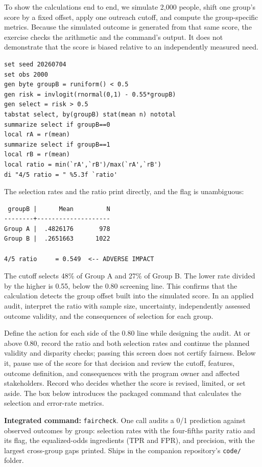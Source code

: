 \documentclass[
    a4paper,
    fontsize=10pt,
    twoside=true,
    numbers=noenddot,
]{kaobook}
\begin{document}
To show the calculations end to end, we simulate 2{,}000 people, shift one group's score by a fixed offset, apply one outreach cutoff, and compute the group-specific metrics. Because the simulated outcome is generated from that same score, the exercise checks the arithmetic and the command's output. It does not demonstrate that the score is biased relative to an independently measured need.
\par
{\footnotesize
\begin{verbatim}
set seed 20260704
set obs 2000
gen byte groupB = runiform() < 0.5
gen risk = invlogit(rnormal(0,1) - 0.55*groupB)
gen select = risk > 0.5
tabstat select, by(groupB) stat(mean n) nototal
summarize select if groupB==0
local rA = r(mean)
summarize select if groupB==1
local rB = r(mean)
local ratio = min(`rA',`rB')/max(`rA',`rB')
di "4/5 ratio = " %5.3f `ratio'
\end{verbatim}
}
The selection rates and the ratio print directly, and the flag is unambiguous:
\par
{\footnotesize
\begin{verbatim}
 groupB |      Mean         N
--------+--------------------
Group A |  .4826176       978
Group B |  .2651663      1022

4/5 ratio     = 0.549  <-- ADVERSE IMPACT
\end{verbatim}
}
The cutoff selects 48\% of Group A and 27\% of Group B. The lower rate divided by the higher is 0.55, below the 0.80 screening line. This confirms that the calculation detects the group offset built into the simulated score. In an applied audit, interpret the ratio with sample size, uncertainty, independently assessed outcome validity, and the consequences of selection for each group.

Define the action for each side of the 0.80 line while designing the audit. At or above 0.80, record the ratio and both selection rates and continue the planned validity and disparity checks; passing this screen does not certify fairness. Below it, pause use of the score for that decision and review the cutoff, features, outcome definition, and consequences with the program owner and affected stakeholders. Record who decides whether the score is revised, limited, or set aside. The box below introduces the packaged command that calculates the selection and error-rate metrics.

\begin{kaobox}[frametitle=Package Integration: \texttt{faircheck}]
\textbf{Integrated command:} \texttt{faircheck}. One call audits a 0/1 prediction against observed outcomes by group: selection rates with the four-fifths parity ratio and its flag, the equalized-odds ingredients (TPR and FPR), and precision, with the largest cross-group gaps printed. Ships in the companion repository's \texttt{code/} folder.
\end{kaobox}
\end{document}
